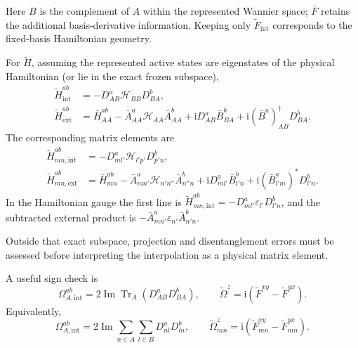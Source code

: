\documentclass[prx,amsmath,amssymb,superscriptaddress,longbibliography]{revtex4-2}
\newcommand{\Tr}{\operatorname{Tr}}
\newcommand{\Ima}{\operatorname{Im}}
\newcommand{\ii}{\mathrm{i}}
\begin{document}
Here $B$ is the complement of $A$ within the represented Wannier space;
$\bar F$ retains the additional basis-derivative information.
Keeping only $\widetilde F_{\mathrm{int}}$ corresponds to the fixed-basis
Hamiltonian geometry.

For $\widetilde H$, assuming the represented active states are eigenstates
of the physical Hamiltonian (or lie in the exact frozen subspace),
\begin{align}
 \widetilde H^{ab}_{\mathrm{int}}&=-D_{AB}^a\mathcal H_{BB}D_{BA}^b,\nonumber\\
 \widetilde H^{ab}_{\mathrm{ext}}
 &=\bar H_{AA}^{ab}-\bar A_{AA}^a\mathcal H_{AA}\bar A_{AA}^b
    +\ii D_{AB}^a\bar B_{BA}^b
    +\ii(\bar B^a)^\dagger_{AB}D_{BA}^b.
 \label{eq:Hinterpolation}
\end{align}
The corresponding matrix elements are
\begin{align}
 \widetilde H_{mn,\mathrm{int}}^{ab}
 &=-D_{ml'}^a\mathcal H_{l'p'}D_{p'n}^b,\nonumber\\
 \widetilde H_{mn,\mathrm{ext}}^{ab}
 &=\bar H_{mn}^{ab}-\bar A_{mn'}^a\mathcal H_{n'n''}\bar A_{n''n}^b
 +\ii D_{ml'}^a\bar B_{l'n}^b
 +\ii(\bar B_{l'm}^a)^*D_{l'n}^b.
 \label{eq:Hinterpolation-components}
\end{align}
In the Hamiltonian gauge the first line is
$\widetilde H_{mn,\mathrm{int}}^{ab}=-D_{ml'}^a\varepsilon_{l'}D_{l'n}^b$,
and the subtracted external product is
$-\bar A_{mn'}^a\varepsilon_{n'}\bar A_{n'n}^b$.

Outside that exact subspace, projection and disentanglement errors must be
assessed before interpreting the interpolation as a physical matrix element.

A useful sign check is
\begin{equation}
 \Omega_{A,\mathrm{int}}^{ab}
 =2\Ima\Tr_A(D_{AB}^aD_{BA}^b),\qquad
 \widetilde\Omega^z=\ii(\widetilde F^{xy}-\widetilde F^{yx}).
 \label{eq:curvature-check}
\end{equation}
Equivalently,
\begin{equation}
 \Omega_{A,\mathrm{int}}^{ab}
 =2\Ima\sum_{n\in A}\sum_{l\in B}D_{nl}^aD_{ln}^b,\qquad
 \widetilde\Omega_{mn}^z=\ii(\widetilde F_{mn}^{xy}-\widetilde F_{mn}^{yx}).
 \label{eq:curvature-check-components}
\end{equation}
\end{document}
